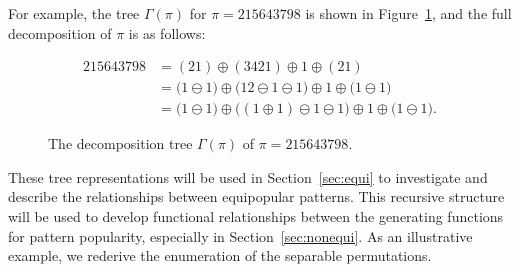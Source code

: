 \documentclass[10pt]{article}
\theoremstyle{definition}
\numberwithin{equation}{section}
\numberwithin{figure}{section}
\begin{document}
For example, the tree $\Gamma(\pi)$ for $\pi = 215643798$ is shown in  Figure~\ref{fig:decomp-tree}, and the full decomposition of $\pi$ is as follows:

 \[
 \begin{aligned} 
    215643798 &= (21) \oplus (3421) \oplus 1 \oplus (21) \\
            &= \big( 1 \ominus 1 \big) 
              \oplus \big(12 \ominus 1 \ominus 1\big) 
              \oplus 1 \oplus \big( 1 \ominus 1\big) \\
            &= \big( 1 \ominus 1 \big) 
              \oplus \big((1 \oplus 1) \ominus 1 \ominus 1\big) 
              \oplus 1 \oplus \big( 1 \ominus 1\big).
\end{aligned}
\]

  \begin{figure}[t]
    \centering
  \caption{The decomposition tree $\Gamma(\pi)$ of $\pi = 215643798$.}
  \label{fig:decomp-tree}
  \end{figure}

These tree representations will be used in Section~\ref{sec:equi} to investigate and describe the relationships between equipopular patterns. This recursive structure will be used to develop functional relationships between the generating functions for pattern popularity, especially in Section~\ref{sec:nonequi}. As an illustrative example, we rederive the enumeration of the separable permutations. 
\end{document}

